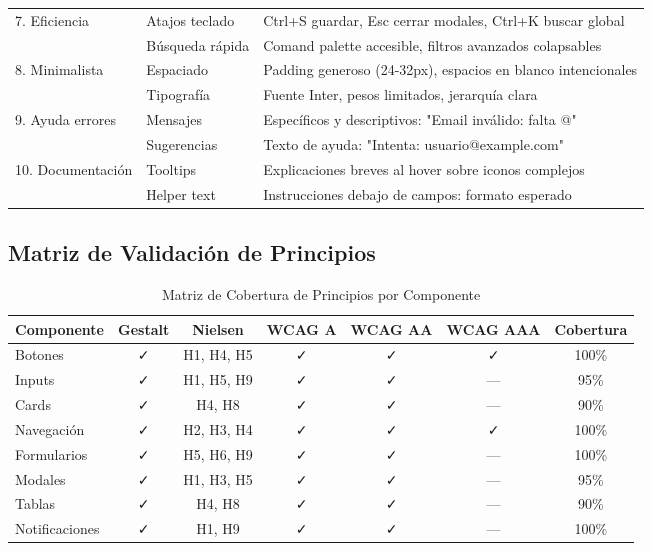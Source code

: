 \documentclass[12pt,a4paper,oneside]{article}
\begin{document}
\begin{table}[h]
\begin{tabular}{|p{3cm}|p{2cm}|p{5.2cm}|}
\hline
\multirow{2}{*}{7. Eficiencia} 
& Atajos teclado & Ctrl+S guardar, Esc cerrar modales, Ctrl+K buscar global \\
\cline{2-3}
& Búsqueda rápida & Comand palette accesible, filtros avanzados colapsables \\
\hline
\multirow{2}{*}{8. Minimalista} 
& Espaciado & Padding generoso (24-32px), espacios en blanco intencionales \\
\cline{2-3}
& Tipografía & Fuente Inter, pesos limitados, jerarquía clara \\
\hline
\multirow{2}{*}{9. Ayuda errores} 
& Mensajes & Específicos y descriptivos: "Email inválido: falta @" \\
\cline{2-3}
& Sugerencias & Texto de ayuda: "Intenta: usuario@example.com" \\
\hline
\multirow{2}{*}{10. Documentación} 
& Tooltips & Explicaciones breves al hover sobre iconos complejos \\
\cline{2-3}
& Helper text & Instrucciones debajo de campos: formato esperado \\
\hline
\end{tabular}
\end{table}

\newpage

\subsection{Matriz de Validación de Principios}

\begin{table}[h]
\centering
\caption{Matriz de Cobertura de Principios por Componente}
\label{tab:matriz-validacion}
\scriptsize
\begin{tabular}{|l|c|c|c|c|c|c|}
\hline
\textbf{Componente} & \textbf{Gestalt} & \textbf{Nielsen} & \textbf{WCAG A} & \textbf{WCAG AA} & \textbf{WCAG AAA} & \textbf{Cobertura} \\
\hline
Botones & ✓ & H1, H4, H5 & ✓ & ✓ & ✓ & 100\% \\
\hline
Inputs & ✓ & H1, H5, H9 & ✓ & ✓ & — & 95\% \\
\hline
Cards & ✓ & H4, H8 & ✓ & ✓ & — & 90\% \\
\hline
Navegación & ✓ & H2, H3, H4 & ✓ & ✓ & ✓ & 100\% \\
\hline
Formularios & ✓ & H5, H6, H9 & ✓ & ✓ & — & 100\% \\
\hline
Modales & ✓ & H1, H3, H5 & ✓ & ✓ & — & 95\% \\
\hline
Tablas & ✓ & H4, H8 & ✓ & ✓ & — & 90\% \\
\hline
Notificaciones & ✓ & H1, H9 & ✓ & ✓ & — & 100\% \\
\hline
\end{tabular}
\end{table}
\end{document}
